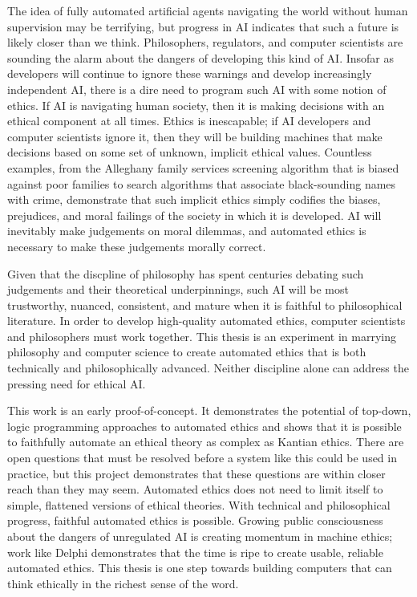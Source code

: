 \begin{isabellebody}
\begin{isamarkuptext}
The idea of fully automated artificial agents navigating the world without human supervision
may be terrifying, but progress in AI indicates that such a future is likely closer than we think. 
Philosophers, regulators, and computer scientists are sounding the alarm about the dangers of developing
this kind of AI. Insofar as developers will continue to ignore these warnings and develop increasingly 
independent AI, there is a dire need to program such AI with some notion of ethics. If AI is navigating
human society, then it is making decisions with an ethical component at all times. Ethics is inescapable; 
if AI developers and computer scientists ignore it, then they will be building machines that make decisions
based on some set of unknown, implicit ethical values. Countless examples, from the Alleghany family services screening
algorithm that is biased against poor families to search algorithms that associate black-sounding names
with crime, demonstrate that such implicit ethics simply codifies the biases, prejudices, and moral
failings of the society in which it is developed. AI will inevitably make judgements on moral dilemmas, 
and automated ethics is necessary to make these judgements morally correct. 

Given that the discpline of philosophy has spent centuries debating such judgements and their theoretical 
underpinnings, such AI will be most trustworthy, nuanced, consistent, and mature when it is faithful to 
philosophical literature. In order to develop high-quality automated ethics, computer scientists and 
philosophers must work together. This thesis is an experiment in marrying philosophy and computer science 
to create automated ethics that is both technically and philosophically advanced. Neither discipline alone
can address the pressing need for ethical AI.

This work is an early proof-of-concept. It demonstrates the potential of top-down, logic programming 
approaches to automated ethics and shows that it is possible to faithfully automate an ethical theory as
complex as Kantian ethics. There are open questions that must be resolved before a system like this 
could be used in practice, but this project demonstrates that these questions are within closer reach
than they may seem. Automated ethics does not need to limit itself to simple, flattened versions of 
ethical theories. With technical and philosophical progress, faithful automated ethics is possible.
Growing public consciousness about the dangers of unregulated AI is creating momentum in machine ethics; 
work like Delphi demonstrates that the time is ripe to create usable, reliable automated ethics. This 
thesis is one step towards building computers that can think ethically in the richest sense of the word.%
\end{isamarkuptext}\isamarkuptrue%
%
\isadelimtheory
%
\endisadelimtheory
%
\isatagtheory
%
\endisatagtheory
{\isafoldtheory}%
%
\isadelimtheory
%
\endisadelimtheory
%
\end{isabellebody}%
